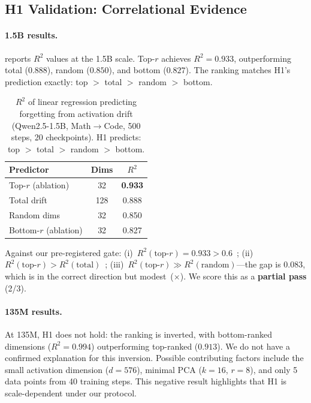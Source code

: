 \subsection{H1 Validation: Correlational Evidence}
\label{sec:h1_validation}

\paragraph{1.5B results.}
 reports $R^2$ values at the 1.5B scale.
Top-$r$ achieves $R^2 = 0.933$, outperforming total ($0.888$), random ($0.850$), and bottom ($0.827$).
The ranking matches H1's prediction exactly: top $>$ total $>$ random $>$ bottom.

\begin{table}[t]
\centering
\caption{$R^2$ of linear regression predicting forgetting from activation drift (Qwen2.5-1.5B, Math$\to$Code, 500 steps, 20 checkpoints). H1 predicts: top $>$ total $>$ random $>$ bottom.}
\label{tab:h1_results}
\begin{tabular}{lcc}
\toprule
Predictor & Dims & $R^2$ \\
\midrule
Top-$r$ (ablation) & 32 & \textbf{0.933} \\
Total drift & 128 & 0.888 \\
Random dims & 32 & 0.850 \\
Bottom-$r$ (ablation) & 32 & 0.827 \\
\bottomrule
\end{tabular}
\end{table}

Against our pre-registered gate:
(i)~$R^2(\text{top-}r) = 0.933 > 0.6$~\checkmark;
(ii)~$R^2(\text{top-}r) > R^2(\text{total})$~\checkmark;
(iii)~$R^2(\text{top-}r) \gg R^2(\text{random})$---the gap is $0.083$, which is in the correct direction but modest~($\times$).
We score this as a \textbf{partial pass} (2/3).

\paragraph{135M results.}
At 135M, H1 does not hold: the ranking is inverted, with bottom-ranked dimensions ($R^2 = 0.994$) outperforming top-ranked ($0.913$).
We do not have a confirmed explanation for this inversion.
Possible contributing factors include the small activation dimension ($d = 576$), minimal PCA ($k = 16$, $r = 8$), and only 5 data points from 40 training steps.
This negative result highlights that H1 is scale-dependent under our protocol.

